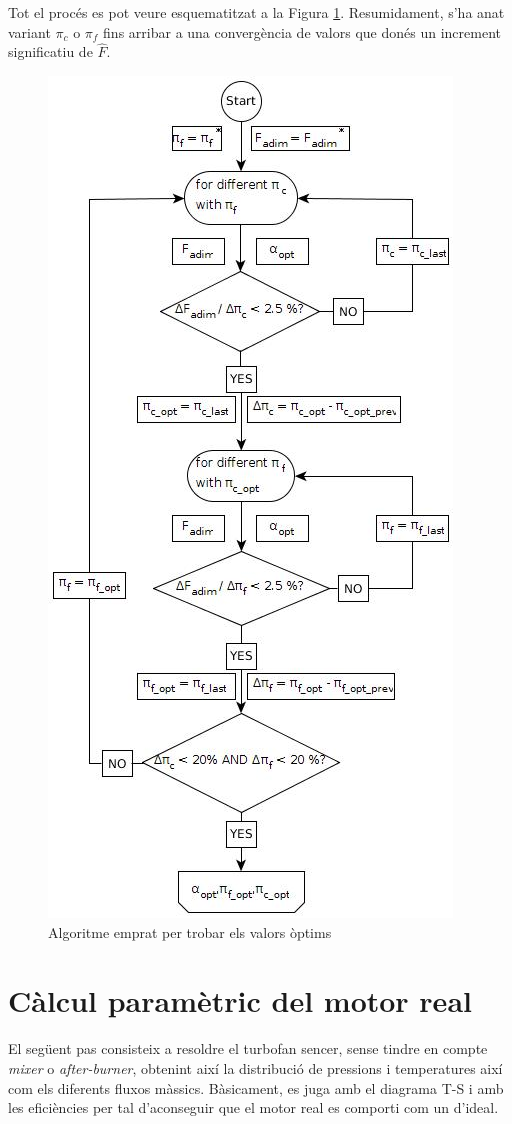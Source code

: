 Tot el procés es pot veure esquematitzat a la Figura \ref{opt}. Resumidament, s'ha anat variant $\pi_c$ o $\pi_f$ fins arribar a una convergència de valors que donés un increment significatiu de $\hat{F}$. 
\begin{figure}[H]
	\centering
	\includegraphics[scale=0.6]{./pics/optimization}
	\caption{Algoritme emprat per trobar els valors òptims}
	\label{opt}
\end{figure}
\section{Càlcul paramètric del motor real}
El següent pas consisteix a resoldre el turbofan sencer, sense tindre en compte \textit{mixer} o \textit{after-burner}, obtenint així la distribució de pressions i temperatures així com els diferents fluxos màssics. Bàsicament, es juga amb el diagrama T-S i amb les eficiències per tal d'aconseguir que el motor real es comporti com un d'ideal.

